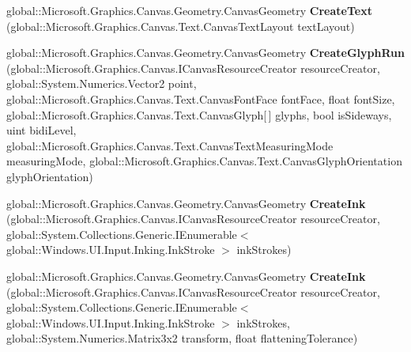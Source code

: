 \begin{DoxyCompactItemize}
global\+::\+Microsoft.\+Graphics.\+Canvas.\+Geometry.\+Canvas\+Geometry {\bfseries Create\+Text} (global\+::\+Microsoft.\+Graphics.\+Canvas.\+Text.\+Canvas\+Text\+Layout text\+Layout)
\item 
\mbox{\label{interface_microsoft_1_1_graphics_1_1_canvas_1_1_geometry_1_1_i_canvas_geometry_statics_a8f9a378b73b213c3e0922eb74c733547}} 
global\+::\+Microsoft.\+Graphics.\+Canvas.\+Geometry.\+Canvas\+Geometry {\bfseries Create\+Glyph\+Run} (global\+::\+Microsoft.\+Graphics.\+Canvas.\+I\+Canvas\+Resource\+Creator resource\+Creator, global\+::\+System.\+Numerics.\+Vector2 point, global\+::\+Microsoft.\+Graphics.\+Canvas.\+Text.\+Canvas\+Font\+Face font\+Face, float font\+Size, global\+::\+Microsoft.\+Graphics.\+Canvas.\+Text.\+Canvas\+Glyph\mbox{[}$\,$\mbox{]} glyphs, bool is\+Sideways, uint bidi\+Level, global\+::\+Microsoft.\+Graphics.\+Canvas.\+Text.\+Canvas\+Text\+Measuring\+Mode measuring\+Mode, global\+::\+Microsoft.\+Graphics.\+Canvas.\+Text.\+Canvas\+Glyph\+Orientation glyph\+Orientation)
\item 
\mbox{\label{interface_microsoft_1_1_graphics_1_1_canvas_1_1_geometry_1_1_i_canvas_geometry_statics_a088a8471e98beba079ac4f1fdb7c630d}} 
global\+::\+Microsoft.\+Graphics.\+Canvas.\+Geometry.\+Canvas\+Geometry {\bfseries Create\+Ink} (global\+::\+Microsoft.\+Graphics.\+Canvas.\+I\+Canvas\+Resource\+Creator resource\+Creator, global\+::\+System.\+Collections.\+Generic.\+I\+Enumerable$<$ global\+::\+Windows.\+U\+I.\+Input.\+Inking.\+Ink\+Stroke $>$ ink\+Strokes)
\item 
\mbox{\label{interface_microsoft_1_1_graphics_1_1_canvas_1_1_geometry_1_1_i_canvas_geometry_statics_a339073000d1d1a908f60c234f50d7966}} 
global\+::\+Microsoft.\+Graphics.\+Canvas.\+Geometry.\+Canvas\+Geometry {\bfseries Create\+Ink} (global\+::\+Microsoft.\+Graphics.\+Canvas.\+I\+Canvas\+Resource\+Creator resource\+Creator, global\+::\+System.\+Collections.\+Generic.\+I\+Enumerable$<$ global\+::\+Windows.\+U\+I.\+Input.\+Inking.\+Ink\+Stroke $>$ ink\+Strokes, global\+::\+System.\+Numerics.\+Matrix3x2 transform, float flattening\+Tolerance)
\item 
\mbox{\label{interface_microsoft_1_1_graphics_1_1_canvas_1_1_geometry_1_1_i_canvas_geometry_statics_a985c955babc779083dbb22e1289f16fa}} 

\end{DoxyCompactItemize}
